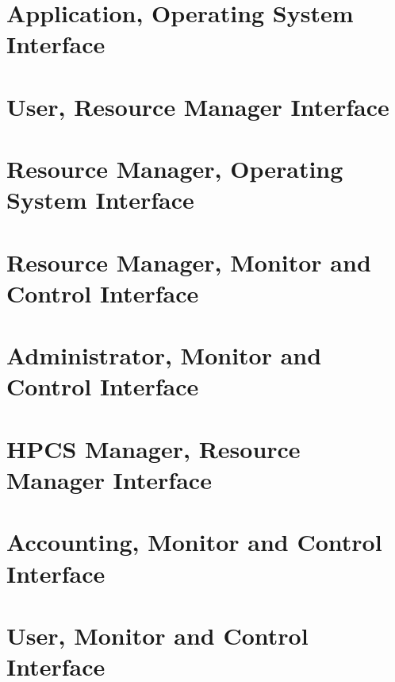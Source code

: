 \newpage
\section{Application, Operating System Interface}\label{sec:AppOS}


\newpage
\section{User, Resource Manager Interface}\label{sec:UserRM}


\newpage
\section{Resource Manager, Operating System Interface}\label{sec:RMOS}


\newpage
\section{Resource Manager, Monitor and Control Interface}\label{sec:RMMC}


\newpage
\section{Administrator, Monitor and Control Interface}\label{sec:AdminMC}


\newpage
\section{HPCS Manager, Resource Manager Interface}\label{sec:MgrRM}


\newpage
\section{Accounting, Monitor and Control Interface}\label{sec:AccMC}


\newpage
\section{User, Monitor and Control Interface}\label{sec:UserMC}


